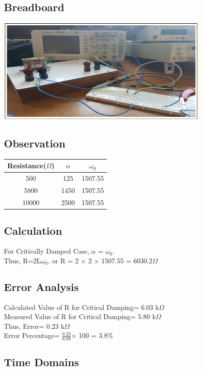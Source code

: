 \documentclass{article}
\begin{document}
\subsection{Breadboard}
\begin{center}
    \includegraphics[width=0.8\textwidth]{i8.png}
\end{center}
\subsection{Observation}
\begin{center}
\begin{tabular}{|c|c|c|}
\hline
    Resistance($\Omega$) & $\alpha$ & $\omega_{0}$ \\
    \hline
    500 & 125 & 1507.55 \\
    5800 & 1450 & 1507.55 \\
    10000 & 2500 & 1507.55 \\
\hline
\end{tabular}
\end{center}

\subsection{Calculation}
For Critically Damped Case, $\alpha$ = $\omega_{0}$.\\
Thus, R=2L$\omega_{0}$. or R = 2 × 2 × 1507.55 = 6030.2$\Omega$

\subsection{Error Analysis}
Calculated Value of R for Critical Damping= 6.03 k$\Omega$ \\
Measured Value of R for Critical Damping= 5.80 k$\Omega$ \\
Thus, Error= 0.23 k$\Omega$ \\
Error Percentage= $\frac{0.23}{6.03}$× 100 = 3.8\%

\subsection{Time Domains}
\end{document}
